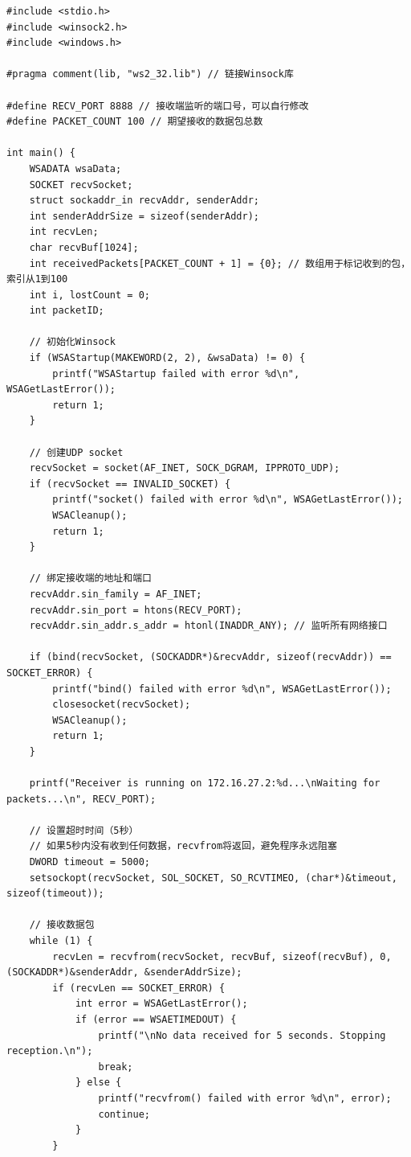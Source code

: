 \documentclass[a4paper]{article}
\begin{document}
\begin{lstlisting}
#include <stdio.h>
#include <winsock2.h>
#include <windows.h>

#pragma comment(lib, "ws2_32.lib") // 链接Winsock库

#define RECV_PORT 8888 // 接收端监听的端口号，可以自行修改
#define PACKET_COUNT 100 // 期望接收的数据包总数

int main() {
    WSADATA wsaData;
    SOCKET recvSocket;
    struct sockaddr_in recvAddr, senderAddr;
    int senderAddrSize = sizeof(senderAddr);
    int recvLen;
    char recvBuf[1024];
    int receivedPackets[PACKET_COUNT + 1] = {0}; // 数组用于标记收到的包，索引从1到100
    int i, lostCount = 0;
    int packetID;

    // 初始化Winsock
    if (WSAStartup(MAKEWORD(2, 2), &wsaData) != 0) {
        printf("WSAStartup failed with error %d\n", WSAGetLastError());
        return 1;
    }

    // 创建UDP socket
    recvSocket = socket(AF_INET, SOCK_DGRAM, IPPROTO_UDP);
    if (recvSocket == INVALID_SOCKET) {
        printf("socket() failed with error %d\n", WSAGetLastError());
        WSACleanup();
        return 1;
    }

    // 绑定接收端的地址和端口
    recvAddr.sin_family = AF_INET;
    recvAddr.sin_port = htons(RECV_PORT);
    recvAddr.sin_addr.s_addr = htonl(INADDR_ANY); // 监听所有网络接口

    if (bind(recvSocket, (SOCKADDR*)&recvAddr, sizeof(recvAddr)) == SOCKET_ERROR) {
        printf("bind() failed with error %d\n", WSAGetLastError());
        closesocket(recvSocket);
        WSACleanup();
        return 1;
    }

    printf("Receiver is running on 172.16.27.2:%d...\nWaiting for packets...\n", RECV_PORT);

    // 设置超时时间（5秒）
    // 如果5秒内没有收到任何数据，recvfrom将返回，避免程序永远阻塞
    DWORD timeout = 5000;
    setsockopt(recvSocket, SOL_SOCKET, SO_RCVTIMEO, (char*)&timeout, sizeof(timeout));

    // 接收数据包
    while (1) {
        recvLen = recvfrom(recvSocket, recvBuf, sizeof(recvBuf), 0, (SOCKADDR*)&senderAddr, &senderAddrSize);
        if (recvLen == SOCKET_ERROR) {
            int error = WSAGetLastError();
            if (error == WSAETIMEDOUT) {
                printf("\nNo data received for 5 seconds. Stopping reception.\n");
                break;
            } else {
                printf("recvfrom() failed with error %d\n", error);
                continue;
            }
        }


\end{lstlisting}
\end{document}
